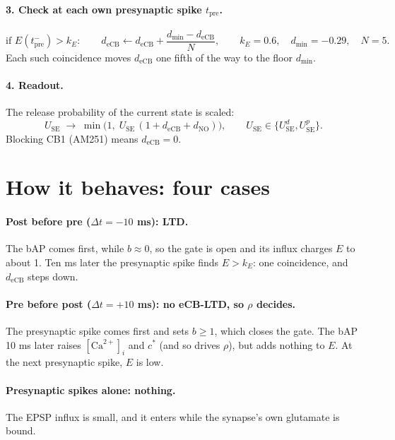 \documentclass[11pt]{article}
\newcommand{\Ca}{[\mathrm{Ca}^{2+}]_i}
\newcommand{\USE}{U_{\mathrm{SE}}}
\newcommand{\deCB}{d_{\mathrm{eCB}}}
\newcommand{\dNO}{d_{\mathrm{NO}}}
\newcommand{\tpre}{t_{\mathrm{pre}}}
\begin{document}
\paragraph{3. Check at each own presynaptic spike $\tpre$.}
\begin{equation}
\text{if } E(\tpre^-)>k_E:\qquad \deCB\leftarrow\deCB+\frac{d_{\min}-\deCB}{N},
\qquad k_E=0.6,\quad d_{\min}=-0.29,\quad N=5 .
\end{equation}
Each such coincidence moves $\deCB$ one fifth of the way to the floor $d_{\min}$.

\paragraph{4. Readout.} The release probability of the current state is scaled:
\begin{equation}
\USE\;\to\;\min\bigl(1,\;\USE\,(1+\deCB+\dNO)\bigr),\qquad \USE\in\{\USE^d,\USE^p\}.
\end{equation}
Blocking CB1 (AM251) means $\deCB=0$.

\section{How it behaves: four cases}

\paragraph{Post before pre ($\Delta t=-10$ ms): LTD.}
The bAP comes first, while $b\approx0$, so the gate is open and its influx charges $E$ to about 1. Ten ms later the
presynaptic spike finds $E>k_E$: one coincidence, and $\deCB$ steps down.

\paragraph{Pre before post ($\Delta t=+10$ ms): no eCB-LTD, so $\rho$ decides.}
The presynaptic spike comes first and sets $b\ge1$, which closes the gate. The bAP 10 ms later raises $\Ca$ and
$c^*$ (and so drives $\rho$), but adds nothing to $E$. At the next presynaptic spike, $E$ is low.

\paragraph{Presynaptic spikes alone: nothing.}
The EPSP influx is small, and it enters while the synapse's own glutamate is bound.
\end{document}
